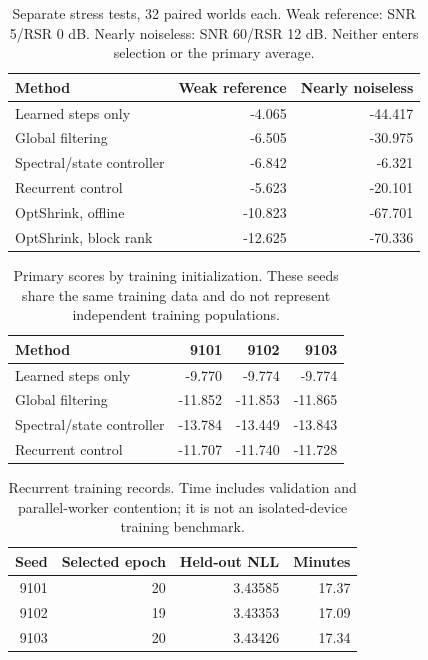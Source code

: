 \begin{table}[!t]
\caption{Separate stress tests, 32 paired worlds each. Weak reference: SNR 5/RSR 0 dB. Nearly noiseless: SNR 60/RSR 12 dB. Neither enters selection or the primary average.}
\label{tab:compact-stress}\centering\footnotesize
\setlength{\tabcolsep}{3pt}
\begin{tabular}{@{}lrr@{}}\toprule
Method & Weak reference & Nearly noiseless\\
\midrule
Learned steps only & -4.065 & -44.417\\
Global filtering & -6.505 & -30.975\\
Spectral/state controller & -6.842 & -6.321\\
Recurrent control & -5.623 & -20.101\\
OptShrink, offline & -10.823 & -67.701\\
OptShrink, block rank & -12.625 & -70.336\\
\bottomrule
\end{tabular}
\end{table}


\begin{table}[!t]
\caption{Primary scores by training initialization. These seeds share the same training data and do not represent independent training populations.}
\label{tab:compact-seeds}\centering\footnotesize
\setlength{\tabcolsep}{3pt}
\begin{tabular}{@{}lrrr@{}}\toprule
Method & 9101 & 9102 & 9103\\
\midrule
Learned steps only & -9.770 & -9.774 & -9.774\\
Global filtering & -11.852 & -11.853 & -11.865\\
Spectral/state controller & -13.784 & -13.449 & -13.843\\
Recurrent control & -11.707 & -11.740 & -11.728\\
\bottomrule
\end{tabular}
\end{table}


\begin{table}[!t]
\caption{Recurrent training records. Time includes validation and parallel-worker contention; it is not an isolated-device training benchmark.}
\label{tab:compact-training}\centering\footnotesize
\setlength{\tabcolsep}{3pt}
\begin{tabular}{@{}rrrr@{}}\toprule
Seed & Selected epoch & Held-out NLL & Minutes\\
\midrule
9101 & 20 & 3.43585 & 17.37\\
9102 & 19 & 3.43353 & 17.09\\
9103 & 20 & 3.43426 & 17.34\\
\bottomrule
\end{tabular}
\end{table}


